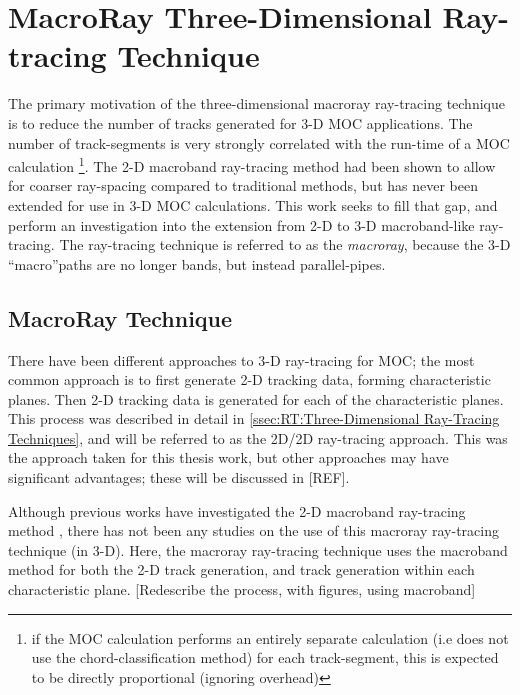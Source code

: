 \chapter{MacroRay Three-Dimensional Ray-tracing Technique}{\label{ch:MacroRay Three-Dimensional Ray-tracing Technique}
  
  
  
  \def\figpath{chapters/MacroRay/figures/}
  \graphicspath{ {\figpath} }

  The primary motivation of the three-dimensional macroray ray-tracing technique is to reduce the number of tracks generated for 3-D \ac{MOC} applications.
  The number of track-segments is very strongly correlated with the run-time of a \ac{MOC} calculation \footnote{if the \ac{MOC} calculation performs an entirely separate calculation (i.e does not use the chord-classification method) for each track-segment, this is expected to be directly proportional (ignoring overhead)}.
  The 2-D macroband ray-tracing method had been shown to allow for coarser ray-spacing compared to traditional methods, but has never been extended for use in 3-D \ac{MOC} calculations.
  This work seeks to fill that gap, and perform an investigation into the extension from 2-D to 3-D macroband-like ray-tracing.
  The ray-tracing technique is referred to as the \emph{macroray}, because the 3-D ``macro''paths are no longer bands, but instead parallel-pipes.

  \section{MacroRay Technique}{\label{sec:MR:MacroRay Technique}
    There have been different approaches to 3-D ray-tracing for \ac{MOC}; the most common approach is to first generate 2-D tracking data, forming characteristic planes.
    Then 2-D tracking data is generated for each of the characteristic planes.
    This process was described in detail in \cref{ssec:RT:Three-Dimensional Ray-Tracing Techniques}, and will be referred to as the 2D/2D ray-tracing approach.
    This was the approach taken for this thesis work, but other approaches may have significant advantages; these will be discussed in [REF].

    Although previous works have investigated the 2-D macroband ray-tracing method \cite{Yamamoto2005,Fevotte2007,Yamamoto2008}, there has not been any studies on the use of this macroray ray-tracing technique (in 3-D).
    Here, the macroray ray-tracing technique uses the macroband method for both the 2-D track generation, and track generation within each characteristic plane.
    [Redescribe the process, with figures, using macroband]

}}
